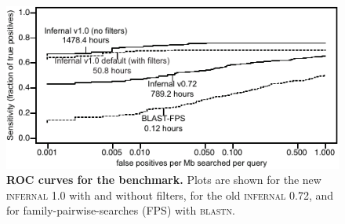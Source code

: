 \newpage
\begin{figure}
\begin{center}
\includegraphics[width=6.4in]{figs/roc-short}
\caption{\textbf{ROC curves for the benchmark.}  Plots are shown for
the new \textsc{infernal} 1.0 with and without filters, for the old 
\textsc{infernal} 0.72, and for
family-pairwise-searches (FPS) with \textsc{blastn}.}
\label{fig:roc}
\end{center}
\end{figure}
